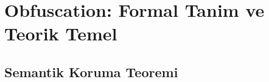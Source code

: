 

%
%



\section{Obfuscation: Formal Tanim ve Teorik Temel}
\label{sec:obf-formal}

\subsection{Semantik Koruma Teoremi}

